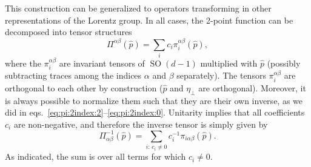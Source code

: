 \documentclass[a4paper,12pt]{article}
\DeclareMathOperator{\SO}{\text{SO}}
\begin{document}
This construction can be generalized to operators transforming in other representations of the Lorentz group. In all cases, the 2-point function can be decomposed into tensor structures
\begin{equation}
	\Pi^{\alpha\beta}(\hat{p})
	= \sum_i c_i \pi_i^{\alpha\beta}(\hat{p}),
\end{equation}
where the $\pi_i^{\alpha\beta}$ are invariant tensors of $\SO(d-1)$ multiplied with $\hat{p}$ (possibly subtracting traces among the indices $\alpha$ and $\beta$ separately).
The tensors $\pi_i^{\alpha\beta}$ are orthogonal to each other by construction ($\hat{p}$ and $\eta_\perp$ are orthogonal). Moreover, it is always possible to normalize them such that they are their own inverse, as we did in eqs.~\eqref{eq:pi:2index:2}--\eqref{eq:pi:2index:0}.
Unitarity implies that all coefficients $c_i$ are non-negative, and therefore the inverse tensor is simply given by
\begin{equation}
	\Pi^{-1}_{\alpha\beta}(\hat{p})
	= \sum_{i: \, c_i \neq 0}
	c_i^{-1} \pi_{i\alpha\beta}(\hat{p}).
\end{equation}
As indicated, the sum is over all terms for which $c_i \neq 0$. 
\end{document}
